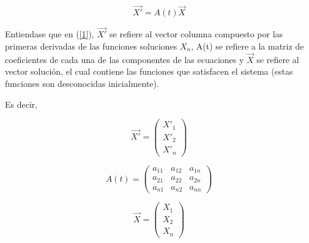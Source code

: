 \documentclass[titlepage]{article}
\begin{document}
        \begin{equation}
            \Vec{X'} = A(t)\Vec{X}
            \label{1}
        \end{equation}
        
        Entiendase que en (\ref{1}), $\Vec{X'}$ se refiere al vector columna compuesto por las primeras derivadas de las funciones soluciones $X_n$, A(t) se refiere a la matriz de coeficientes de cada una de las componentes de las ecuaciones y $\vec{X}$ se refiere al vector solución, el cual contiene las funciones que satisfacen el sistema (estas funciones son desconocidas inicialmente).\cite{Kreyszing2003} \par\vspace{0.4cm}
        
        Es decir, \par\vspace{0.4cm}
        
        \begin{equation*}
            \Vec{X'} = 
            \begin{pmatrix}
                X'_1 \\ 
                X'_2 \\ 
                X'_n 
            \end{pmatrix}
        \end{equation*} \par\vspace{0.4cm}
        
        \begin{equation*}
            A(t) = 
            \begin{pmatrix}
                a_{11} & a_{12} & a_{1n} \\ 
                a_{21} & a_{22} & a_{2n} \\ 
                a_{n1} & a_{n2} & a_{nn} 
            \end{pmatrix}
        \end{equation*} \par\vspace{0.4cm}
        
        \begin{equation*}
            \Vec{X} = 
            \begin{pmatrix}
                X_1 \\ 
                X_2 \\ 
                X_n 
            \end{pmatrix}
        \end{equation*} \par\vspace{0.4cm}
        
\end{document}
